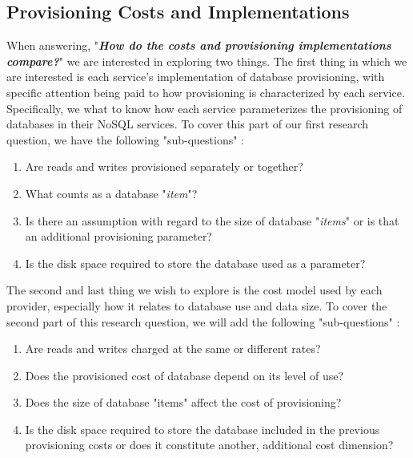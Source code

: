 
\subsection{Provisioning Costs and Implementations}

When answering, "\emph{\textbf{How do the costs and provisioning implementations compare?}}" we are interested in exploring two things.  The first thing in which we are interested is each service's implementation of database provisioning, with specific attention being paid to how provisioning is characterized by each service.  Specifically, we what to know how each service parameterizes the provisioning of databases in their NoSQL services.  To cover this part of our first research question, we have the following "sub-questions" :

\vspace{0.1in}
\begin{spacing}{1.2}
\begin{enumerate}[label=\large{\textbf{1 - \Alph*}):}]
	\item Are reads and writes provisioned separately or together?  
	\vspace{0.05in}
	\item What counts as a database "\emph{item}"?
	\vspace{0.05in}
	\item Is there an assumption with regard to the size of database "\emph{items}" or is that an additional provisioning parameter?
	\vspace{0.05in}
	\item Is the disk space required to store the database used as a parameter?
\end{enumerate}
\end{spacing}

The second and last thing we wish to explore is the cost model used by each provider, especially how it relates to database use and data size.  To cover the second part of this research question, we will add the following "sub-questions" :

\vspace{0.1in}
\begin{spacing}{1.2}
\begin{enumerate}[label=\large{\textbf{1 - \Alph*}):}]
	\addtocounter{enumi}{4} 
	\item Are reads and writes charged at the same or different rates?
	\vspace{0.05in}
	\item Does the provisioned cost of database depend on its level of use?
	\vspace{0.05in}
	\item Does the size of database "items" affect the cost of provisioning?
	\vspace{0.05in}
	\item Is the disk space required to store the database included in the previous provisioning costs or does it constitute another, additional cost dimension?
\end{enumerate}
\end{spacing}


